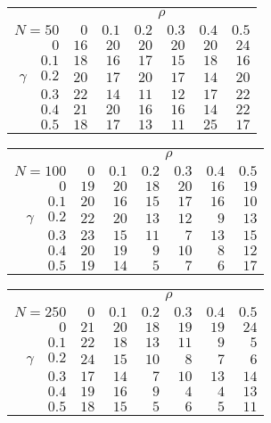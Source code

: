 \begin{tabular}{r|rrrrrr}
\hline\hline
 &\multicolumn{6}{c}{$\rho$} \\ 
 $N = 50$ & $0$ & $0.1$ & $0.2$ & $0.3$ & $0.4$ & $0.5$ \\ 
 \hline$0$ & $16$ & $20$ & $20$ & $20$ & $20$ & $24$\\ 
$0.1$ & $18$ & $16$ & $17$ & $15$ & $18$ & $16$\\ 
$\gamma\quad$$0.2$ & $20$ & $17$ & $20$ & $17$ & $14$ & $20$\\ 
$0.3$ & $22$ & $14$ & $11$ & $12$ & $17$ & $22$\\ 
$0.4$ & $21$ & $20$ & $16$ & $16$ & $14$ & $22$\\ 
$0.5$ & $18$ & $17$ & $13$ & $11$ & $25$ & $17$\\ 
 \hline 
 \end{tabular}
 
 \vspace{2em} 
 
\begin{tabular}{r|rrrrrr}
\hline\hline
 &\multicolumn{6}{c}{$\rho$} \\ 
 $N = 100$ & $0$ & $0.1$ & $0.2$ & $0.3$ & $0.4$ & $0.5$ \\ 
 \hline$0$ & $19$ & $20$ & $18$ & $20$ & $16$ & $19$\\ 
$0.1$ & $20$ & $16$ & $15$ & $17$ & $16$ & $10$\\ 
$\gamma\quad$$0.2$ & $22$ & $20$ & $13$ & $12$ & $9$ & $13$\\ 
$0.3$ & $23$ & $15$ & $11$ & $7$ & $13$ & $15$\\ 
$0.4$ & $20$ & $19$ & $9$ & $10$ & $8$ & $12$\\ 
$0.5$ & $19$ & $14$ & $5$ & $7$ & $6$ & $17$\\ 
 \hline 
 \end{tabular}
 
 \vspace{2em} 
 
\begin{tabular}{r|rrrrrr}
\hline\hline
 &\multicolumn{6}{c}{$\rho$} \\ 
 $N = 250$ & $0$ & $0.1$ & $0.2$ & $0.3$ & $0.4$ & $0.5$ \\ 
 \hline$0$ & $21$ & $20$ & $18$ & $19$ & $19$ & $24$\\ 
$0.1$ & $22$ & $18$ & $13$ & $11$ & $9$ & $5$\\ 
$\gamma\quad$$0.2$ & $24$ & $15$ & $10$ & $8$ & $7$ & $6$\\ 
$0.3$ & $17$ & $14$ & $7$ & $10$ & $13$ & $14$\\ 
$0.4$ & $19$ & $16$ & $9$ & $4$ & $4$ & $13$\\ 
$0.5$ & $18$ & $15$ & $5$ & $6$ & $5$ & $11$\\ 
 \hline 
 \end{tabular}
